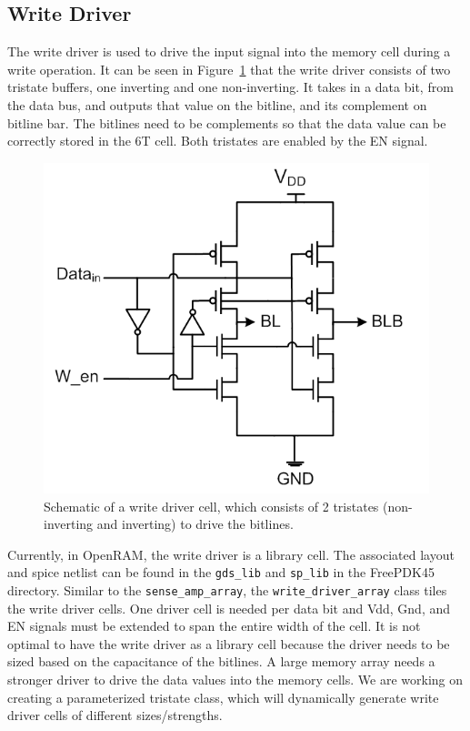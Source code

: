 \subsection{Write Driver}
\label{sec:writedriver}
The write driver is used to drive the input signal into the memory
cell during a write operation.  It can be seen in
Figure~\ref{fig:write_driver} that the write driver consists of two
tristate buffers, one inverting and one non-inverting.  It takes in a
data bit, from the data bus, and outputs that value on the bitline,
and its complement on bitline bar.  The bitlines need to be
complements so that the data value can be correctly stored in the 6T
cell. Both tristates are enabled by the EN signal.

\begin{figure}[h!]
\centering
\includegraphics[scale=.8]{./figs/write_driver_schem.pdf}
\caption{Schematic of a write driver cell, which consists of 2 tristates (non-inverting and inverting) to drive the bitlines.}
\label{fig:write_driver}
\end{figure}

Currently, in OpenRAM, the write driver is a library cell.  The
associated layout and spice netlist can be found in the \verb|gds_lib| and
\verb|sp_lib| in the FreePDK45 directory.  Similar to the \verb|sense_amp_array|,
the \verb|write_driver_array| class tiles the write driver cells.  One
driver cell is needed per data bit and Vdd, Gnd, and EN signals must
be extended to span the entire width of the cell. It is not optimal to
have the write driver as a library cell because the driver needs to be
sized based on the capacitance of the bitlines.  A large memory array
needs a stronger driver to drive the data values into the memory
cells.  We are working on creating a parameterized tristate class,
which will dynamically generate write driver cells of different
sizes/strengths.

